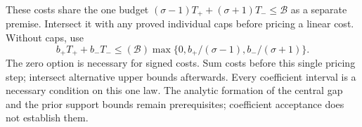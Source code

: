 \documentclass[11pt,a4paper]{article}
\begin{document}
These costs share the one budget
$(\sigma-1)T_++(\sigma+1)T_-\le \mathcal B$ as a separate premise. Intersect it with any proved individual
caps before pricing a linear cost. Without caps, use
\[
 b_+T_++b_-T_-\le(\mathcal B)
 \max\{0,b_+/(\sigma-1),b_-/(\sigma+1)\}.
\]
The zero option is necessary for signed costs. Sum costs before this
single pricing step; intersect alternative upper bounds afterwards.
Every coefficient interval is a necessary condition on this one law.
The analytic formation of the central gap and the prior support bounds
remain prerequisites; coefficient acceptance does not establish them.
\end{document}
